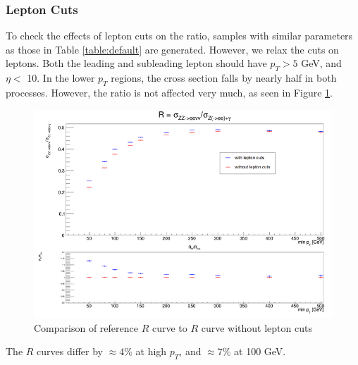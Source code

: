 \documentclass[11pt,a4paper,final]{report}
\begin{document}
\subsubsection{Lepton Cuts}
To check the effects of lepton cuts on the ratio, samples with similar parameters as those in Table \ref{table:default} are generated. However, we relax the cuts on leptons. Both the leading and subleading lepton should have $p_T > 5$ GeV, and $\eta <$ 10. In the lower $p_T$ regions, the cross section falls by nearly half in both processes. However, the ratio is not affected very much, as seen in Figure \ref{fig:lepcut}.
\begin{figure}[H]
\centering
	\includegraphics[width = 0.7\linewidth]{lep_cuts.png}
	\caption{Comparison of reference $R$ curve to $R$ curve without lepton cuts}
	\label{fig:lepcut}
\end{figure}
The $R$ curves differ by $\approx 4\%$ at high $p_T$, and $\approx 7\%$ at 100 GeV.
\end{document}
